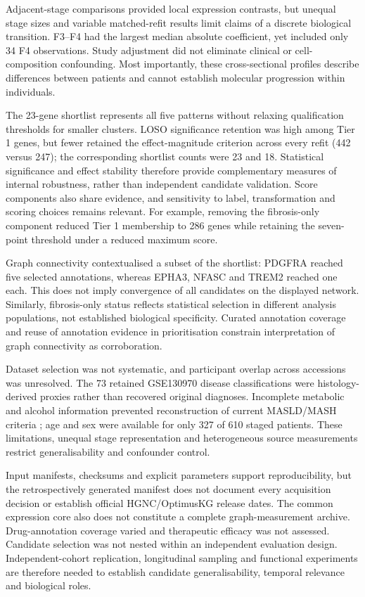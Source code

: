 \documentclass[11pt,a4paper]{article}
\begin{document}
Adjacent-stage comparisons provided local expression contrasts, but unequal stage sizes and variable matched-refit results limit claims of a discrete biological transition. F3--F4 had the largest median absolute coefficient, yet included only 34 F4 observations. Study adjustment did not eliminate clinical or cell-composition confounding. Most importantly, these cross-sectional profiles describe differences between patients and cannot establish molecular progression within individuals.

The 23-gene shortlist represents all five patterns without relaxing qualification thresholds for smaller clusters. LOSO significance retention was high among Tier 1 genes, but fewer retained the effect-magnitude criterion across every refit (442 versus 247); the corresponding shortlist counts were 23 and 18. Statistical significance and effect stability therefore provide complementary measures of internal robustness, rather than independent candidate validation. Score components also share evidence, and sensitivity to label, transformation and scoring choices remains relevant. For example, removing the fibrosis-only component reduced Tier 1 membership to 286 genes while retaining the seven-point threshold under a reduced maximum score.

Graph connectivity contextualised a subset of the shortlist: PDGFRA reached five selected annotations, whereas EPHA3, NFASC and TREM2 reached one each. This does not imply convergence of all candidates on the displayed network. Similarly, fibrosis-only status reflects statistical selection in different analysis populations, not established biological specificity. Curated annotation coverage and reuse of annotation evidence in prioritisation constrain interpretation of graph connectivity as corroboration.

Dataset selection was not systematic, and participant overlap across accessions was unresolved. The 73 retained GSE130970 disease classifications were histology-derived proxies rather than recovered original diagnoses. Incomplete metabolic and alcohol information prevented reconstruction of current MASLD/MASH criteria \cite{ref3}; age and sex were available for only 327 of 610 staged patients. These limitations, unequal stage representation and heterogeneous source measurements restrict generalisability and confounder control.

Input manifests, checksums and explicit parameters support reproducibility, but the retrospectively generated manifest does not document every acquisition decision or establish official HGNC/OptimusKG release dates. The common expression core also does not constitute a complete graph-measurement archive. Drug-annotation coverage varied and therapeutic efficacy was not assessed. Candidate selection was not nested within an independent evaluation design. Independent-cohort replication, longitudinal sampling and functional experiments are therefore needed to establish candidate generalisability, temporal relevance and biological roles.
\end{document}
